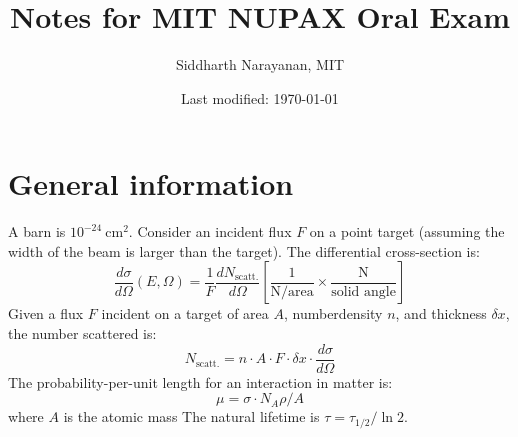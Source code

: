 \documentclass[11pt]{article}
\newcommand{\dd}[2]{\dfrac{d #1}{d #2}}
\newcommand{\cm}{\text{cm}}
\begin{document}
\title{Notes for MIT NUPAX Oral Exam}
\date{Last modified: \today}
\author{Siddharth Narayanan, MIT}

\maketitle

\tableofcontents

\section{General information}

A barn is $10^{-24}~\cm^2$. Consider an incident flux $F$ on a point target (assuming the width of the beam is larger than the target). The differential cross-section is:
\begin{equation}
  \dd{\sigma}{\Omega}(E,\Omega) = \frac{1}{F} \dd{N_\text{scatt.}}{\Omega} \left[\frac{1}{\text{N/area}} \times \frac{\text{N}}{\text{solid angle}}\right]
\end{equation}
Given a flux $F$ incident on a target of area $A$, numberdensity $n$, and thickness $\delta x$, the number scattered is:
\begin{equation}
  N_\text{scatt.} = n\cdot A\cdot F\cdot \delta x \cdot \dd\sigma\Omega
\end{equation}
The probability-per-unit length for an interaction in matter is:
\begin{equation}
  \mu = \sigma\cdot N_A\rho/A
\end{equation}
where $A$ is the atomic mass
\noindent The natural lifetime is $\tau = \tau_{1/2}/\ln 2$.
\end{document}
